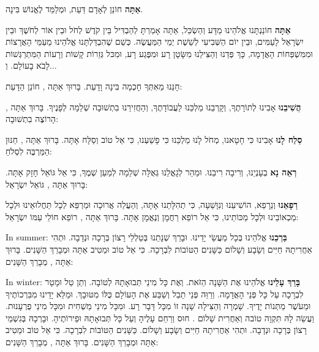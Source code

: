 \textbf{אַתָּה} חוֹנֵן לְאָדָם דַּעַת, וּמְלַמֵּד לֶאֱנוֹשׁ בִּינָה.

\textbf{אַתָּה} חוֹנַנְתָּנוּ \Shem{} אֱלֹהֵינוּ מַדָּע וְהַשְׂכֵּל, אַתָּה אָמַרְתָּ לְהַבְדִּיל בֵּין קֹדֶשׁ לְחֹל וּבֵין אוֹר לְחֹשֶׁךְ וּבֵין יִשְׂרָאֵל לָעַמִּים, וּבֵין יוֹם הַשְּׁבִיעִי לְשֵׁשֶׁת יְמֵי הַמַּעֲשֶׂה. כְּשֵׁם שֶׁהִבְדַּלְתָּנוּ \Shem{} אֱלֹהֵינוּ מֵעַמֵּי הָאֲרָצוֹת וּמִמִּשְׁפְּחוֹת הָאֲדָמָה, כָּךְ פְּדֵנוּ וְהַצִּילֵנוּ מִשָּׂטָן רָע וּמִפֶּגַע רָע, וּמִכּל גְּזֵרוֹת קָשׁוֹת וְרָעוֹת הַמִּתְרַגְּשׁוֹת לָבֹא בָעוֹלָם. וְ...

חָנֵּנוּ מֵאִתְּךָ חָכְמָה בִּינָה וָדָעַת. בָּרוּךְ אַתָּה \Shem{}, חוֹנֵן הַדָּעַת:

\textbf{הֲשִׁיבֵנוּ} אָבִינוּ לְתוֹרָתֶךָ, וְקָרְבֵנוּ מַלְכֵּנוּ לַעֲבוֹדָתֶךָ, וְהַחֲזִירֵנוּ בִתְשׁוּבָה שְׁלֵמָה לְפָנֶיךָ. בָּרוּךְ אַתָּה \Shem{}, הָרוֹצֶה בִתְשׁוּבָה:

\textbf{סְלַח לָנוּ} אָבִינוּ כִּי חָטָאנוּ, מְחֹל לָנוּ מַלְכֵּנוּ כִּי פָשַׁעְנוּ, כִּי אֵל טוֹב וְסַלָּח אָתָּה. בָּרוּךְ אַתָּה \Shem{}, חַנּוּן הַמַּרְבֶּה לִסְלֹחַ:

\textbf{רְאֵה נָא} בְעָנְיֵנוּ, וְרִיבָה רִיבֵנוּ. וּמַהֵר לְגָאֳלֵנוּ גְּאֻלָּה שְׁלֵמָה לְמַעַן שְׁמֶךָ, כִּי אֵל גּוֹאֵל חָזָק אָתָּה. בָּרוּךְ אַתָּה \Shem{}, גּוֹאֵל יִשְׂרָאֵל:

\textbf{רְפָאֵנוּ} \Shem{} וְנֵרָפֵא, הוֹשִׁיעֵנוּ וְנִוָּשֵׁעָה, כִּי תְהִלָּתֵנוּ אָתָּה, וְהַעֲלֵה אֲרוּכָה וּמַרְפֵּא לְכָל תַּחֲלוּאֵינוּ וּלְכָל מַכְאוֹבֵינוּ וּלְכָל מַכּוֹתֵינוּ, כִּי אֵל רוֹפֵא רַחֲמָן וְנֶאֱמָן אָתָּה. בָּרוּךְ אַתָּה \Shem{}, רוֹפֵא חוֹלֵי עַמּוֹ יִשְׂרָאֵל:

\begin{seasonal}{In summer:}
\textbf{בַּרְכֵנוּ} \Shem{} אֱלֹהֵינוּ בְּכָל מַעֲשֵׂי יָדֵינוּ. וּבָרֵךְ שְׁנָתֵנוּ בְּטַלְלֵי רָצוֹן בְּרָכָה וּנְדָבָה. וּתְהִי אַחֲרִיתָהּ חַיִּים וְשָׂבָע וְשָׁלוֹם כַּשָּׁנִים הַטּוֹבוֹת לִבְרָכָה. כִּי אֵל טוֹב וּמֵטִיב אַתָּה וּמְבָרֵךְ הַשָּׁנִים. בָּרוּךְ אַתָּה \Shem{}, מְבָרֵךְ הַשָּׁנִים:
\end{seasonal}

\begin{seasonal}{In winter:}
\textbf{בָּרֵךְ עָלֵינוּ} \Shem{} אֱלֹהֵינוּ אֶת הַשָּׁנָה הַזֹּאת. וְאֶת כָּל מִינֵי תְּבוּאָתָהּ לְטוֹבָה. וְתֵן טַל וּמָטָר לִבְרָכָה עַל כָּל פְּנֵי הָאֲדָמָה. וְרַוֵּה פְּנֵי תֵבֵל וְשַׁבַּע אֶת הָעוֹלָם כֻּלּוֹ מִטּוּבָךְ. וּמַלֵּא יָדֵינוּ מִבִּרְכוֹתֶיךָ וּמֵעֹשֶׁר מַתְּנוֹת יָדֶיךָ. שָׁמְרָה וְהַצִּילָה שָׁנָה זוֹ מִכָּל דָּבָר רָע. וּמִכָּל מִינֵי מַשְׁחִית וּמִכָּל מִינֵי פֻרְעָנוּת. וַעֲשֵׂה לָהּ תִּקְוָה טוֹבה וְאַחֲרִית שָׁלוֹם . חוּס וְרַחֵם עָלֶיהָ וְעַל כָּל תְּבוּאָתָהּ וּפֵירוֹתֶיהָ. וּבָרְכָהּ בְּגִשְׁמֵי רָצוֹן בְּרָכָה וּנְדָבָה. וּתְהִי אַחֲרִיתָהּ חַיִּים וְשָׂבָע וְשָׁלוֹם. כַּשָּׁנִים הַטּוֹבוֹת לִבְרָכָה. כִּי אֵל טוֹב וּמֵטִיב אַתָּה וּמְבָרֵךְ הַשָּׁנִים. בָּרוּךְ אַתָּה \Shem{}, מְבָרֵךְ הַשָּׁנִים:
\end{seasonal}

